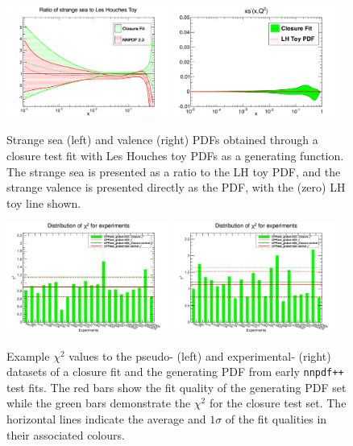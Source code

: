 \begin{figure}[h!]
\centering
\includegraphics[width=0.48\textwidth]{7-PostLHC/figs/strangesea.pdf}
\includegraphics[width=0.48\textwidth]{7-PostLHC/figs/c1_n64.pdf}
\caption[Strange PDFs obtained through a Closure test fit with toy PDFs as a generating function]{Strange sea (left) and valence (right) PDFs obtained through a closure test fit with Les Houches toy PDFs as a generating function. The strange sea is presented as a ratio to the LH toy PDF, and the strange valence is presented directly as the PDF, with the (zero) LH toy line shown.}
\label{fig:LHtoyclosure2}
\end{figure}
\clearpage

\begin{figure}[!]
\centering
\includegraphics[width=0.48\textwidth]{7-PostLHC/figs/chi2_histo_nnpdf1.pdf}
\includegraphics[width=0.48\textwidth]{7-PostLHC/figs/chi2_histo_nnpdf2.pdf}
\caption[$\chi^2$ values to the pseudo- and experimental-datasets of a closure fit and the generating PDF]{Example $\chi^2$ values to the pseudo- (left) and experimental- (right) datasets of a closure fit and the generating PDF from early {\tt nnpdf++} test fits. The red bars show the fit quality of the generating PDF set while the green bars demonstrate the $\chi^2$ for the closure test set. The horizontal lines indicate the average and $1\sigma$ of the fit qualities in their associated colours.}
\label{fig:CPPclosurechi2}
\end{figure}

